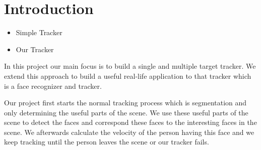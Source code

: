 \section{Introduction}

\begin{itemize}
\item Simple Tracker \\ 


\item Our Tracker\\ 



\end{itemize}

In this project our main focus is to build a single and multiple target tracker. We extend this approach to build a useful real-life application to that tracker which is a face recognizer and tracker.

Our project first starts the normal tracking process which is segmentation and only determining the useful parts of the scene. We use these useful parts of the scene to detect the faces and correspond these faces to the interesting faces in the scene. We afterwards calculate the velocity of the person having this face and we keep tracking until the person leaves the scene or our tracker fails.